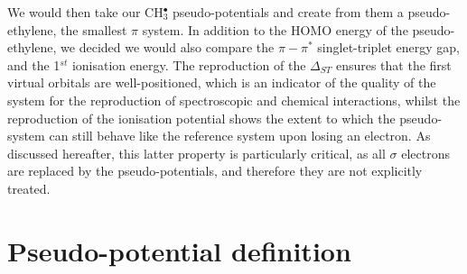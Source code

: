 \documentclass[12pt]{article}
\begin{document}
We would then take our CH$_3^{\bullet}$ pseudo-potentials and create from them a pseudo-ethylene, the smallest $\pi$ system.
In addition to the HOMO energy of the pseudo-ethylene, we decided we would also compare the $\pi-\pi^{*}$ singlet-triplet energy gap, 
and the 1$^{st}$ ionisation energy. 
The reproduction of the $\Delta_{ST}$ ensures that the first virtual 
orbitals are well-positioned, which is an indicator of the quality of the system for the reproduction of spectroscopic and 
chemical interactions, whilst the reproduction of the ionisation potential shows the extent to which the pseudo-system 
can still behave like the reference system upon losing an electron. As discussed hereafter, this latter property is 
particularly critical, as all $\sigma$ electrons are replaced by the pseudo-potentials, and therefore
they are not explicitly treated. 

\section*{\sffamily \large Pseudo-potential definition} \label{secpotdef}
\end{document}
